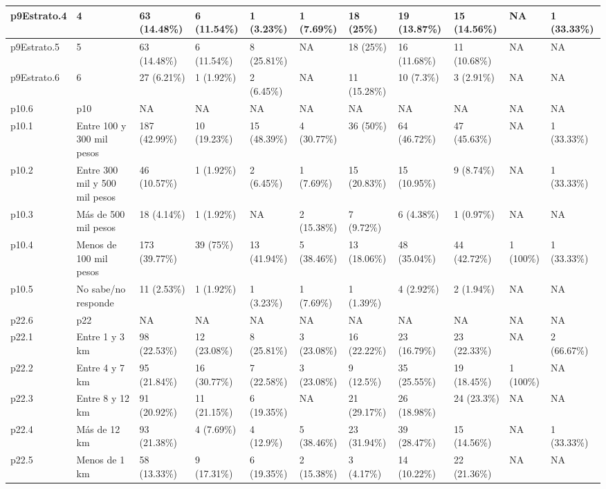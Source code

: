 \begin{table}
{\begin{tabular}[t]{l|l|l|l|l|l|l|l|l|l|l}
\hline
p9Estrato.4 & 4 & 63 (14.48\%) & 6 (11.54\%) & 1 (3.23\%) & 1 (7.69\%) & 18 (25\%) & 19 (13.87\%) & 15 (14.56\%) & NA & 1 (33.33\%)\\
\hline
p9Estrato.5 & 5 & 63 (14.48\%) & 6 (11.54\%) & 8 (25.81\%) & NA & 18 (25\%) & 16 (11.68\%) & 11 (10.68\%) & NA & NA\\
\hline
p9Estrato.6 & 6 & 27 (6.21\%) & 1 (1.92\%) & 2 (6.45\%) & NA & 11 (15.28\%) & 10 (7.3\%) & 3 (2.91\%) & NA & NA\\
\hline
p10.6 & p10 & NA & NA & NA & NA & NA & NA & NA & NA & NA\\
\hline
p10.1 & Entre 100 y 300 mil pesos & 187 (42.99\%) & 10 (19.23\%) & 15 (48.39\%) & 4 (30.77\%) & 36 (50\%) & 64 (46.72\%) & 47 (45.63\%) & NA & 1 (33.33\%)\\
\hline
p10.2 & Entre 300 mil y 500 mil pesos & 46 (10.57\%) & 1 (1.92\%) & 2 (6.45\%) & 1 (7.69\%) & 15 (20.83\%) & 15 (10.95\%) & 9 (8.74\%) & NA & 1 (33.33\%)\\
\hline
p10.3 & Más de 500 mil pesos & 18 (4.14\%) & 1 (1.92\%) & NA & 2 (15.38\%) & 7 (9.72\%) & 6 (4.38\%) & 1 (0.97\%) & NA & NA\\
\hline
p10.4 & Menos de 100 mil pesos & 173 (39.77\%) & 39 (75\%) & 13 (41.94\%) & 5 (38.46\%) & 13 (18.06\%) & 48 (35.04\%) & 44 (42.72\%) & 1 (100\%) & 1 (33.33\%)\\
\hline
p10.5 & No sabe/no responde & 11 (2.53\%) & 1 (1.92\%) & 1 (3.23\%) & 1 (7.69\%) & 1 (1.39\%) & 4 (2.92\%) & 2 (1.94\%) & NA & NA\\
\hline
p22.6 & p22 & NA & NA & NA & NA & NA & NA & NA & NA & NA\\
\hline
p22.1 & Entre 1 y 3 km & 98 (22.53\%) & 12 (23.08\%) & 8 (25.81\%) & 3 (23.08\%) & 16 (22.22\%) & 23 (16.79\%) & 23 (22.33\%) & NA & 2 (66.67\%)\\
\hline
p22.2 & Entre 4 y 7 km & 95 (21.84\%) & 16 (30.77\%) & 7 (22.58\%) & 3 (23.08\%) & 9 (12.5\%) & 35 (25.55\%) & 19 (18.45\%) & 1 (100\%) & NA\\
\hline
p22.3 & Entre 8 y 12 km & 91 (20.92\%) & 11 (21.15\%) & 6 (19.35\%) & NA & 21 (29.17\%) & 26 (18.98\%) & 24 (23.3\%) & NA & NA\\
\hline
p22.4 & Más de 12 km & 93 (21.38\%) & 4 (7.69\%) & 4 (12.9\%) & 5 (38.46\%) & 23 (31.94\%) & 39 (28.47\%) & 15 (14.56\%) & NA & 1 (33.33\%)\\
\hline
p22.5 & Menos de 1 km & 58 (13.33\%) & 9 (17.31\%) & 6 (19.35\%) & 2 (15.38\%) & 3 (4.17\%) & 14 (10.22\%) & 22 (21.36\%) & NA & NA\\

\end{tabular}}
\end{table}
